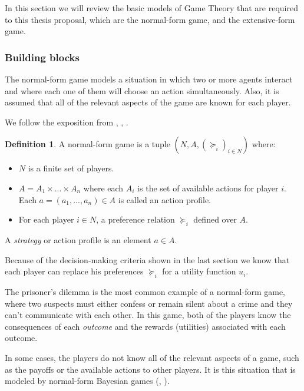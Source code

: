 \documentclass[english,letterpaper,12pt,final]{article}
\theoremstyle{definition}
\newtheorem{defi}{Definition}[section]
\begin{document}
	In this section we will review the basic models of Game Theory that are required to this thesis proposal, which are the normal-form game, and the extensive-form game. 
	\subsubsection{Building blocks}{\label{basic_models}}
	The normal-form game models a situation in which two or more agents interact and where each one of them will choose an action simultaneously. Also, it is assumed that all of the relevant aspects of the game are known for each player.
	
	We follow the exposition from \cite{osborne1994course}, \cite{binmore2007playing}, \cite{shoham2008multiagent}.
	
	\begin{defi}
	A normal-form game is a tuple $(N,A,(\succeq_i)_{i \in N})$ where:
	\begin{itemize}
	\item $N$ is a finite set of players.
	\item $A=A_1 \times ... \times A_n$ where each $A_i$ is the set of available actions for player $i$. Each $a=(a_1,...,a_n) \in A$ is called an action profile.
	\item For each player $i \in N$, a preference relation $\succeq_i$ defined over $A$.
	\end{itemize}
	\end{defi}

A \textit{strategy} or action profile is an element $a \in A$.

Because of the decision-making criteria shown in the last section we know that each player can replace his preferences $\succeq_i$ for a utility function $u_i$.

The prisoner's dilemma is the most common example of a normal-form game, where two suspects must either confess or remain silent about a crime and they can't communicate with each other. In this game, both of the players know the consequences of each \textit{outcome} and the rewards (utilities) associated with each outcome.

In some cases, the players do not know all of the relevant aspects of a game, such as the payoffs or the available actions to other players. It is this situation that is modeled by normal-form Bayesian games (\cite{osborne1994course}, \cite{shoham2008multiagent}).
\end{document}
